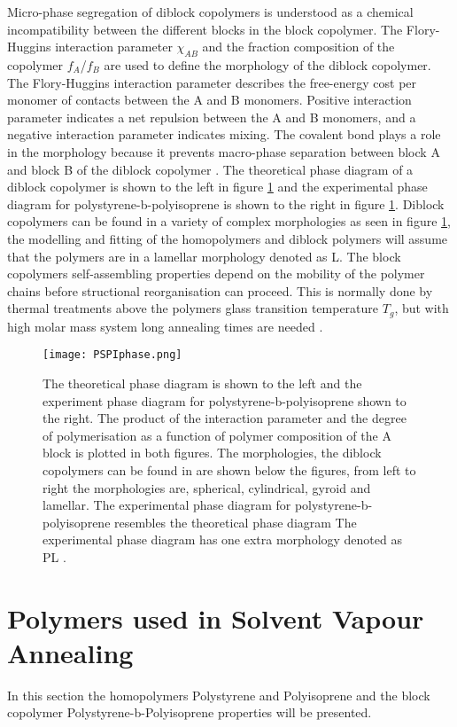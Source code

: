 \documentclass[MasterThesisMain.tex]{subfiles}
\begin{document}
Micro-phase segregation of diblock copolymers is understood as a chemical incompatibility between the different blocks in the block copolymer. The Flory-Huggins interaction parameter $\chi_{AB}$ and the fraction composition of the copolymer $f_A$/$f_B$ are used to define the morphology of the diblock copolymer. The Flory-Huggins interaction parameter describes the free-energy cost per monomer of contacts between the A and B monomers. Positive interaction parameter indicates a net repulsion between the A and B monomers, and a negative interaction parameter indicates mixing. The covalent bond plays a role in the morphology because it prevents macro-phase separation between block A and block B of the diblock copolymer \cite{designpolymers}. The theoretical phase diagram of a diblock copolymer is shown to the left in figure \ref{fig:blockfase} and the experimental phase diagram for polystyrene-b-polyisoprene is shown to the right in figure \ref{fig:blockfase}. Diblock copolymers can be found in a variety of complex morphologies as seen in figure \ref{fig:blockfase}, the modelling and fitting of the homopolymers and diblock polymers will assume that the polymers are in a lamellar morphology denoted as L. The block copolymers self-assembling properties depend on the mobility of the polymer chains before structional reorganisation can proceed. This is normally done by thermal treatments above the polymers glass transition temperature $T_g$, but with high molar mass system long annealing times are needed \cite{SVABCP}.

\begin{figure}[H]
\centering
\texttt{[image: PSPIphase.png]}
\caption{The theoretical phase diagram is shown to the left and the experiment phase diagram for polystyrene-b-polyisoprene shown to the right. The product of the interaction parameter and the degree of polymerisation as a function of polymer composition of the A block is plotted in both figures. The morphologies, the diblock copolymers can be found in are shown below the figures, from left to right the morphologies are, spherical, cylindrical, gyroid and lamellar. The experimental phase diagram for polystyrene-b-polyisoprene resembles the theoretical phase diagram The experimental phase diagram has one extra morphology denoted as PL \cite{designpolymers}.}
\label{fig:blockfase}
\end{figure}

\section{Polymers used in Solvent Vapour Annealing}
In this section the homopolymers Polystyrene and Polyisoprene and the block copolymer Polystyrene-b-Polyisoprene properties will be presented.  
\end{document}
